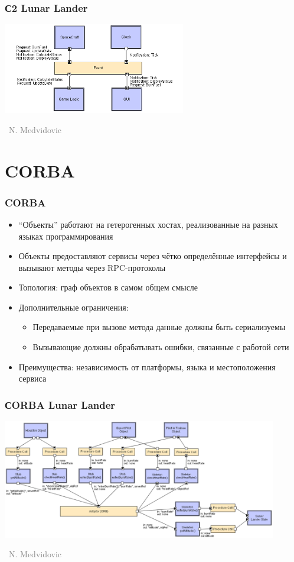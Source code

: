 \documentclass[xetex,mathserif,serif]{beamer}
\newcommand{\attribution}[1] {
    \vspace{-5mm}\begin{flushright}\begin{scriptsize}\textcolor{gray}{\textcopyright\, #1}\end{scriptsize}\end{flushright}
}
\begin{document}
    \begin{frame}
        \frametitle{С2 Lunar Lander}
        \begin{center}
            \includegraphics[width=0.6\textwidth]{c2LL.png}
            \attribution{N. Medvidovic}
        \end{center}
    \end{frame}

    \section{CORBA}

    \begin{frame}
        \frametitle{CORBA}
        \begin{itemize}
            \item ``Объекты'' работают на гетерогенных хостах, реализованные на разных языках программирования 
            \item Объекты предоставляют сервисы через чётко определённые интерфейсы и вызывают методы через RPC-протоколы
            \item Топология: граф объектов в самом общем смысле
            \item Дополнительные ограничения:
            \begin{itemize}
                \item Передаваемые при вызове метода данные должны быть сериализуемы
                \item Вызывающие должны обрабатывать ошибки, связанные с работой сети
            \end{itemize}
            \item Преимущества: независимость от платформы, языка и местоположения сервиса
        \end{itemize}
    \end{frame}

    \begin{frame}
        \frametitle{СORBA Lunar Lander}
        \begin{center}
            \includegraphics[width=0.9\textwidth]{corbaLL.png}
            \attribution{N. Medvidovic}
        \end{center}
    \end{frame}
\end{document}

